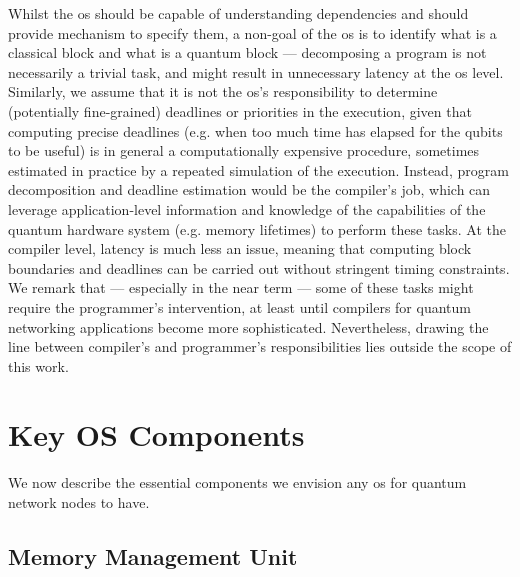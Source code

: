 Whilst the \acrshort{os} should be capable of understanding dependencies and should provide
mechanism to specify them, a non-goal of the \acrshort{os} is to identify what is a classical block
and what is a quantum block --- decomposing a program is not necessarily a trivial task, and might
result in unnecessary latency at the \acrshort{os} level. Similarly, we assume that it is not the
\acrshort{os}'s responsibility to determine (potentially fine-grained) deadlines or priorities in
the execution, given that computing precise deadlines (e.g. when too much time has elapsed for the
qubits to be useful) is in general a computationally expensive procedure, sometimes estimated in
practice by a repeated simulation of the execution. Instead, program decomposition and deadline
estimation would be the compiler's job, which can leverage application-level information and
knowledge of the capabilities of the quantum hardware system (e.g. memory lifetimes) to perform
these tasks. At the compiler level, latency is much less an issue, meaning that computing block
boundaries and deadlines can be carried out without stringent timing constraints. We remark that ---
especially in the near term --- some of these tasks might require the programmer's intervention, at
least until compilers for quantum networking applications become more sophisticated. Nevertheless,
drawing the line between compiler's and programmer's responsibilities lies outside the scope of this
work.

\section{Key OS Components}
\label{sec:arch:components}

We now describe the essential components we envision any \acrshort{os} for quantum network nodes to
have.

\subsection{Memory Management Unit}

